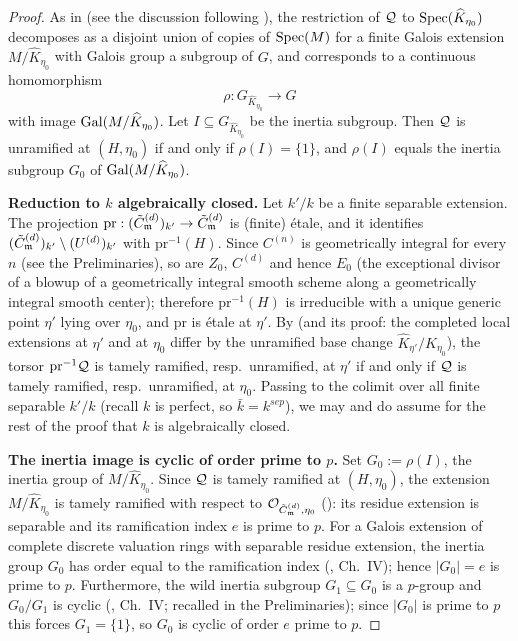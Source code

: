 \begin{proof}
    As in  (see the discussion following
    ), the restriction of $\mathcal{Q}$ to
    $\operatorname{Spec}(\widehat{K}_{\eta_0})$ decomposes as a disjoint union of copies of $\operatorname{Spec}(M)$ for a
    finite Galois extension $M / \widehat{K}_{\eta_0}$ with Galois group a subgroup of $G$, and
    corresponds to a continuous homomorphism
    \[ \rho : G_{\widehat{K}_{\eta_0}} \to G \]
    with image $\operatorname{Gal}(M/\widehat{K}_{\eta_0})$. Let $I \subseteq G_{\widehat{K}_{\eta_0}}$ be the
    inertia subgroup. Then $\mathcal{Q}$ is unramified at $(H,\eta_0)$ if and only if
    $\rho(I) = \{1\}$, and $\rho(I)$ equals the inertia subgroup $G_0$ of
    $\operatorname{Gal}(M/\widehat{K}_{\eta_0})$.

    \textbf{Reduction to $k$ algebraically closed.}
    Let $k'/k$ be a finite separable extension. The projection
    $\mathrm{pr} : (\tilde{C}_{\mathfrak{m}}^{(d)})_{k'} \to \tilde{C}_{\mathfrak{m}}^{(d)}$ is (finite) \'etale, and it identifies
    $(\tilde{C}_{\mathfrak{m}}^{(d)})_{k'} \setminus (U^{(d)})_{k'}$ with $\mathrm{pr}^{-1}(H)$. Since $C^{(n)}$ is
    geometrically integral for every $n$ (see the Preliminaries), so are $Z_0$, $C^{(d)}$ and hence
    $E_0$ (the exceptional divisor of a blowup of a geometrically integral smooth scheme along a
    geometrically integral smooth center); therefore $\mathrm{pr}^{-1}(H)$ is irreducible with a unique
    generic point $\eta'$ lying over $\eta_0$, and $\mathrm{pr}$ is \'etale at $\eta'$. By
     (and its proof: the completed local extensions at
    $\eta'$ and at $\eta_0$ differ by the unramified base change
    $\widehat{K}_{\eta'} / \widehat{K}_{\eta_0}$), the torsor $\mathrm{pr}^{-1}\mathcal{Q}$ is tamely ramified,
    resp.\ unramified, at $\eta'$ if and only if $\mathcal{Q}$ is tamely ramified, resp.\ unramified, at
    $\eta_0$. Passing to the colimit over all finite separable $k'/k$ (recall $k$ is perfect, so
    $\bar{k} = k^{sep}$), we may and do assume for the rest of the proof that $k$ is algebraically
    closed.

    \textbf{The inertia image is cyclic of order prime to $p$.}
    Set $G_0 := \rho(I)$, the inertia group of $M/\widehat{K}_{\eta_0}$. Since $\mathcal{Q}$ is tamely
    ramified at $(H, \eta_0)$, the extension $M/\widehat{K}_{\eta_0}$ is tamely ramified with
    respect to $\mathcal{O}_{\tilde{C}_{\mathfrak{m}}^{(d)}, \eta_0}$ (): its residue
    extension is separable and its ramification index $e$ is prime to $p$. For a Galois
    extension of complete discrete valuation rings with separable residue extension, the
    inertia group $G_0$ has order equal to the ramification index (\cite{serreLF}, Ch.\ IV);
    hence $|G_0| = e$ is prime to $p$. Furthermore, the wild inertia subgroup
    $G_1 \subseteq G_0$ is a $p$-group and $G_0/G_1$ is cyclic (\cite{serreLF}, Ch.\ IV;
    recalled in the Preliminaries); since $|G_0|$ is prime to $p$ this forces $G_1 = \{1\}$,
    so $G_0$ is cyclic of order $e$ prime to $p$.


\end{proof}
